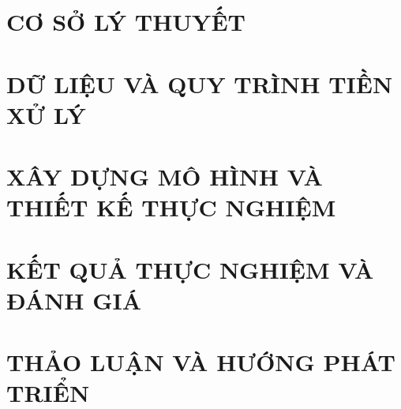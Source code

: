 \documentclass[a4paper,12pt,oneside]{report}
\begin{document}

\clearpage
\renewcommand{\contentsname}{MỤC LỤC}
\renewcommand{\listfigurename}{DANH SÁCH HÌNH VẼ}
\renewcommand{\listtablename}{DANH SÁCH BẢNG}
\tableofcontents
\clearpage

\clearpage
\listoffigures
\clearpage
\listoftables
\clearpage

\chapter{CƠ SỞ LÝ THUYẾT}
\label{chap:ly-thuyet}





\chapter{DỮ LIỆU VÀ QUY TRÌNH TIỀN XỬ LÝ}
\label{chap:dataset-eda}


\chapter{XÂY DỰNG MÔ HÌNH VÀ THIẾT KẾ THỰC NGHIỆM}
\label{chap:phuong-phap}


\chapter{KẾT QUẢ THỰC NGHIỆM VÀ ĐÁNH GIÁ}
\label{chap:ket-qua-thao-luan}



\chapter{THẢO LUẬN VÀ HƯỚNG PHÁT TRIỂN}
\label{chap:ban-luan}



\clearpage
{}
{}


\end{document}
